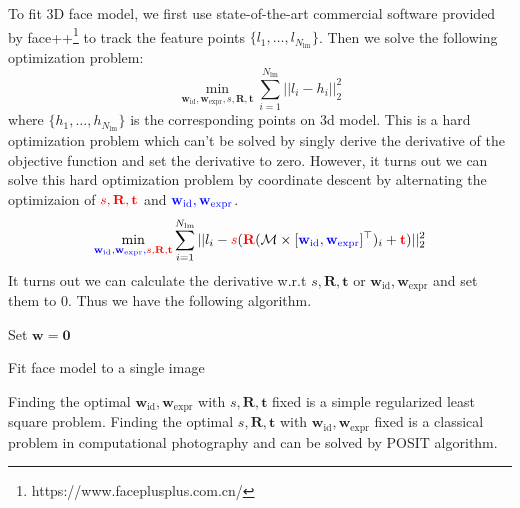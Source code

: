 To fit 3D face model, we first use state-of-the-art commercial software provided by face++\footnote{https://www.faceplusplus.com.cn/} to track the feature points $\{l_1, \dots, l_{N_{\text{lm}}}\}$. Then we solve the following optimization problem:
$$\min_{\mathbf{w}_{\text{id}}, \mathbf{w}_{\text{expr}}, s, \mathbf{R}, \mathbf{t}} \sum_{i=1}^{N_{\text{lm}}}||l_i - h_i||_2^2$$
where $\{h_1, \dots, h_{N_{\text{lm}}}\}$ is the corresponding points on 3d model.
This is a hard optimization problem which can't be solved by singly derive the derivative of the objective function and set the derivative to zero. However, it turns out we can solve this hard optimization problem by coordinate descent by alternating the optimizaion of $\color{red}{s, \mathbf{R}, \mathbf{t}}$ and $\color{blue}{\mathbf{w}_{\text{id}}, \mathbf{w}_{\text{expr}}}$.
$$\min_{\color{blue}{\mathbf{w}_{\text{id}}, \mathbf{w}_{\text{expr}}}, \color{red}{s, \mathbf{R}, \mathbf{t}}} \sum_{i=1}^{N_{\text{lm}}}||l_i - \color{red}{s}\color{black}(\color{red}\mathbf{R}\color{black}(\mathcal{M} \times [\color{blue}{\mathbf{w}_{\text{id}}, \mathbf{w}_{\text{expr}}} \color{black}]^\top)_i + \color{red}{\mathbf{t}} \color{black})||_2^2$$
It turns out we can calculate the derivative w.r.t $s, \mathbf{R}, \mathbf{t}$ or $\mathbf{w}_{\text{id}}, \mathbf{w}_{\text{expr}}$ and set them to $0$. Thus we have the following algorithm.


\begin{algorithm}[H]
Set $\mathbf{w} = \mathbf{0}$\;
\caption{Fit face model to a single image}
\end{algorithm}
Finding the optimal $\mathbf{w}_{\text{id}}, \mathbf{w}_{\text{expr}}$ with $s, \mathbf{R}, \mathbf{t}$ fixed is a simple regularized least square problem. Finding the optimal $s, \mathbf{R}, \mathbf{t}$ with $\mathbf{w}_{\text{id}}, \mathbf{w}_{\text{expr}}$ fixed is a classical problem in computational photography and can be solved by POSIT algorithm\cite{dementhon1995model}.

